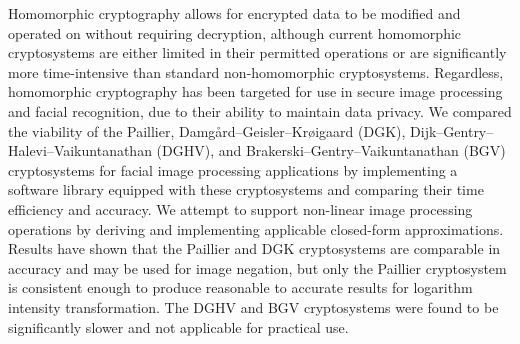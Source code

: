 \begin{thesisabstract}
    \noindent
    Homomorphic cryptography allows for encrypted data to be modified and operated on without requiring decryption, although current homomorphic cryptosystems are either limited in their permitted operations or are significantly more time-intensive than standard non-homomorphic cryptosystems. Regardless, homomorphic cryptography has been targeted for use in secure image processing and facial recognition, due to their ability to maintain data privacy. We compared the viability of the Paillier, Damg{\aa}rd--Geisler--Kr{\o}igaard (DGK), Dijk--Gentry--Halevi--Vaikuntanathan (DGHV), and Brakerski--Gentry--Vaikuntanathan (BGV) cryptosystems for facial image processing applications by implementing a software library equipped with these cryptosystems and comparing their time efficiency and accuracy. We attempt to support non-linear image processing operations by deriving and implementing applicable closed-form approximations. Results have shown that the Paillier and DGK cryptosystems are comparable in accuracy and may be used for image negation, but only the Paillier cryptosystem is consistent enough to produce reasonable to accurate results for logarithm intensity transformation. The DGHV and BGV cryptosystems were found to be significantly slower and not applicable for practical use.

\end{thesisabstract}
